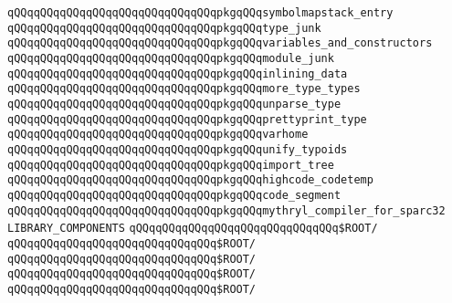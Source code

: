 \verb|qQQqqQQqqQQqqQQqqQQqqQQqqQQqqQQqpkgqQQqsymbolmapstack_entry|\newline
\verb|qQQqqQQqqQQqqQQqqQQqqQQqqQQqqQQqpkgqQQqtype_junk|\newline
\verb|qQQqqQQqqQQqqQQqqQQqqQQqqQQqqQQqpkgqQQqvariables_and_constructors|\newline
\verb|qQQqqQQqqQQqqQQqqQQqqQQqqQQqqQQqpkgqQQqmodule_junk|\newline
\verb|qQQqqQQqqQQqqQQqqQQqqQQqqQQqqQQqpkgqQQqinlining_data|\newline
\verb|qQQqqQQqqQQqqQQqqQQqqQQqqQQqqQQqpkgqQQqmore_type_types|\newline
\verb|qQQqqQQqqQQqqQQqqQQqqQQqqQQqqQQqpkgqQQqunparse_type|\newline
\verb|qQQqqQQqqQQqqQQqqQQqqQQqqQQqqQQqpkgqQQqprettyprint_type|\newline
\verb|qQQqqQQqqQQqqQQqqQQqqQQqqQQqqQQqpkgqQQqvarhome|\newline
\verb|qQQqqQQqqQQqqQQqqQQqqQQqqQQqqQQqpkgqQQqunify_typoids|\newline
\verb|qQQqqQQqqQQqqQQqqQQqqQQqqQQqqQQqpkgqQQqimport_tree|\newline
\verb|qQQqqQQqqQQqqQQqqQQqqQQqqQQqqQQqpkgqQQqhighcode_codetemp|\newline
\verb|qQQqqQQqqQQqqQQqqQQqqQQqqQQqqQQqpkgqQQqcode_segment|\newline
\newline
\verb|qQQqqQQqqQQqqQQqqQQqqQQqqQQqqQQqpkgqQQqmythryl_compiler_for_sparc32|\newline
\newline
\verb|LIBRARY_COMPONENTS|\newline
\verb|qQQqqQQqqQQqqQQqqQQqqQQqqQQqqQQq$ROOT/|\newline
\verb|qQQqqQQqqQQqqQQqqQQqqQQqqQQqqQQq$ROOT/|\newline
\verb|qQQqqQQqqQQqqQQqqQQqqQQqqQQqqQQq$ROOT/|\newline
\verb|qQQqqQQqqQQqqQQqqQQqqQQqqQQqqQQq$ROOT/|\newline
\verb|qQQqqQQqqQQqqQQqqQQqqQQqqQQqqQQq$ROOT/|\newline

